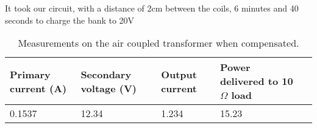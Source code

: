 \documentclass[final]{scrreprt} %
\begin{document}
It took our circuit, with a distance of 2cm between the coils, 6 minutes and 40 seconds to charge the bank to 20V 

\begin{table} [h]
\begin{center}
	\begin{tabular}{ l | l | l | l | l }
	Primary current (A) & Secondary voltage (V) & Output current & Power delivered to 10 $\Omega$ load \\ \hline
  	0.1537 & 12.34 & 1.234 &15.23 \\
	
	\end{tabular}
	\caption{Measurements on the air coupled transformer when compensated.}
	\label{measure1}
\end{center}
\end{table}
\end{document}
